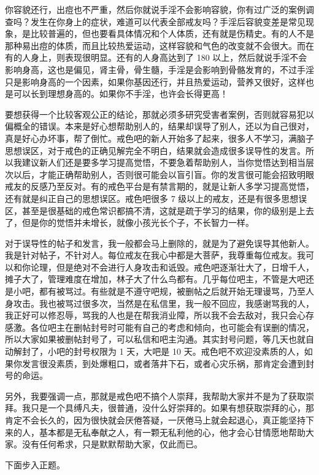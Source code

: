 \documentclass{ctexart}
\begin{document}
你容貌还行，出痘也不严重，然后你就说手淫不会影响容貌，你有过广泛的案例调查吗？发生在你身上的症状，难道可以代表全部戒友吗？手淫后容貌变差是常见现象，是比较普遍的，但也要看具体情况和个人体质，还有就是伤精史。有的人不是那种易出痘的体质，而且比较热爱运动，这样容貌和气色的改变就不会很大。而在有的人身上，则表现很明显。还有的人身高达到了 180 以上，然后就说手淫不会影响身高，这也是偏见，肾主骨，骨生髓，手淫是会影响到骨骼发育的，不过手淫只是影响身高的一个因素，如果你基因还行，并且热爱运动，营养又很好，这样也是可以长到理想身高的。如果你不手淫，也许会长得更高！

要想获得一个比较客观公正的结论，那就必须多研究受害者案例，否则就容易犯以偏概全的错误。本来是好心想帮助别人的，结果却误导了别人，还以为自己很对，真是好心办坏事，帮了倒忙。戒色吧的新人开始多了起来，很多人不学习，满脑子思想误区，对于戒色的正确见解完全不明白，结果就会造成很多误导性的发言。所以我建议新人们还是要多学习提高觉悟，不要急着帮助别人，当你觉悟达到相当层次以后，才能正确帮助别人，否则很可能会以盲引盲。你的发言很可能会招致明眼戒友的反感乃至反对。有的戒色平台是有禁言期的，就是让新人多学习提高觉悟，还有就是纠正自己的思想误区。戒色吧很多 7 级以上的戒友，还是有很多思想误区，甚至是很基础的戒色常识都搞不清，这就是疏于学习的结果，你的级别是上去了，但是你的觉悟并未增长，就像小孩光长个子，不长智力一样。

对于误导性的帖子和发言，我一般都会马上删除的，就是为了避免误导其他新人。我是针对帖子，不针对人。每位戒友在我心中都是大菩萨，我尊重每位戒友。我可以和你论理，但是绝对不会进行人身攻击和诋毁。戒色吧逐渐壮大了，日增千人，摊子大了，管理难度在增加，林子大了什么鸟都有。几乎每位吧主，不管是大吧还是小吧，都有被骂过。有些就是不遵守吧规，被删帖之后就开始无理谩骂，乃至人身攻击。我也被骂过很多次，当然是在私信里，我一般不回应，我感谢骂我的人，我正好可以修忍辱，骂我的人也是在帮我消业障，所以我不会去敌对，我只会心存感激。各位吧主在删帖封号时可能有自己的考虑和倾向，也可能会有误删的情况，所以大家如果被删帖封号了，可以私信和吧主沟通。其实封号问题，等几天也就自动解封了，小吧的封号权限为 1 天，大吧是 10 天。戒色吧不欢迎没素质的人，如果你发言很没素质，到处爆粗口，或者落井下石，或者心灾乐祸，那肯定会遭到封号的命运。

另外，我要强调一点，那就是戒色吧不搞个人崇拜，我帮助大家并不是为了获取崇拜。我只是一个具缚凡夫，很普通，没什么好崇拜的。如果有想获取崇拜的心，那肯定不会长久的，因为很快就会厌倦答疑，一厌倦马上就会起退心，真正能坚持下来的人，基本都是无私奉献之人，有一颗无私利他的心，他才会心甘情愿地帮助大家。没有任何希求，只是默默帮助大家，仅此而已。

下面步入正题。
\end{document}
